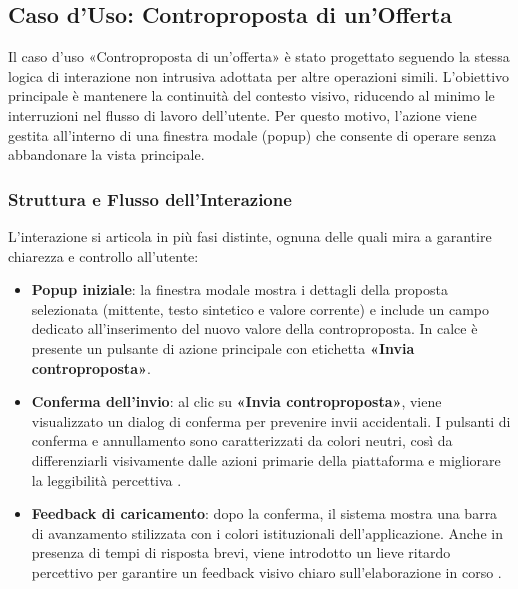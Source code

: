 \subsection{Caso d'Uso: Controproposta di un'Offerta}

Il caso d’uso «Controproposta di un’offerta» è stato progettato seguendo la stessa logica di interazione non intrusiva adottata per altre operazioni simili.
L’obiettivo principale è mantenere la continuità del contesto visivo, riducendo al minimo le interruzioni nel flusso di lavoro dell’utente. Per questo motivo, l’azione viene gestita all’interno di una finestra modale (popup) che consente di operare senza abbandonare la vista principale.

\vspace{0.5cm}
\subsubsection{Struttura e Flusso dell’Interazione}
L’interazione si articola in più fasi distinte, ognuna delle quali mira a garantire chiarezza e controllo all’utente:
\begin{itemize}
	\item \textbf{Popup iniziale}: la finestra modale mostra i dettagli della proposta selezionata (mittente, testo sintetico e valore corrente) e include un campo dedicato all’inserimento del nuovo valore della controproposta.
	In calce è presente un pulsante di azione principale con etichetta \textbf{«Invia controproposta»}.
	
	\item \textbf{Conferma dell’invio}: al clic su \textbf{«Invia controproposta»}, viene visualizzato un dialog di conferma per prevenire invii accidentali.  
	I pulsanti di conferma e annullamento sono caratterizzati da colori neutri, così da differenziarli visivamente dalle azioni primarie della piattaforma e migliorare la leggibilità percettiva \cite{nielsen1995}.
	
	\item \textbf{Feedback di caricamento}: dopo la conferma, il sistema mostra una barra di avanzamento stilizzata con i colori istituzionali dell’applicazione.  
	Anche in presenza di tempi di risposta brevi, viene introdotto un lieve ritardo percettivo per garantire un feedback visivo chiaro sull’elaborazione in corso \cite{shneiderman2004}.
	
	
\end{itemize}

\vspace{0.5cm}
